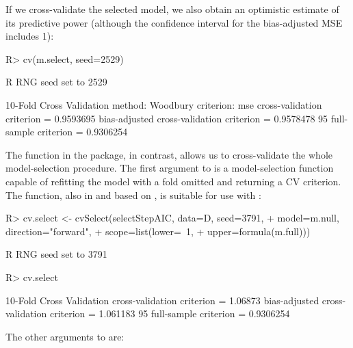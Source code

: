 \documentclass[
]{jss}
\begin{document}
If we cross-validate the selected model, we also obtain an optimistic
estimate of its predictive power (although the confidence interval for
the bias-adjusted MSE includes 1):

\begin{CodeChunk}
\begin{CodeInput}
R> cv(m.select, seed=2529)
\end{CodeInput}
\begin{CodeOutput}
R RNG seed set to 2529
\end{CodeOutput}
\begin{CodeOutput}
10-Fold Cross Validation
method: Woodbury
criterion: mse
cross-validation criterion = 0.9593695
bias-adjusted cross-validation criterion = 0.9578478
95%
full-sample criterion = 0.9306254 
\end{CodeOutput}
\end{CodeChunk}

The  function in the  package, in contrast,
allows us to cross-validate the whole model-selection procedure. The
first argument to  is a model-selection function
capable of refitting the model with a fold omitted and returning a CV
criterion. The  function, also in  and
based on , is suitable for use with :

\begin{CodeChunk}
\begin{CodeInput}
R> cv.select <- cvSelect(selectStepAIC, data=D, seed=3791,
+                       model=m.null, direction="forward",
+                       scope=list(lower=~1, 
+                                  upper=formula(m.full)))
\end{CodeInput}
\begin{CodeOutput}
R RNG seed set to 3791
\end{CodeOutput}
\begin{CodeInput}
R> cv.select
\end{CodeInput}
\begin{CodeOutput}
10-Fold Cross Validation
cross-validation criterion = 1.06873
bias-adjusted cross-validation criterion = 1.061183
95%
full-sample criterion = 0.9306254 
\end{CodeOutput}
\end{CodeChunk}

The other arguments to  are:
\end{document}
